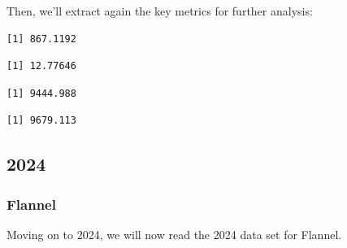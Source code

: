 Then, we'll extract again the key metrics for further analysis:

\begin{Shaded}
\begin{Highlighting}[]
\SpecialCharTok{\$}
\end{Highlighting}
\end{Shaded}

\begin{verbatim}
[1] 867.1192
\end{verbatim}

\begin{Shaded}
\begin{Highlighting}[]
\SpecialCharTok{\$}
\end{Highlighting}
\end{Shaded}

\begin{verbatim}
[1] 12.77646
\end{verbatim}

\begin{Shaded}
\begin{Highlighting}[]
\SpecialCharTok{\$}
\end{Highlighting}
\end{Shaded}

\begin{verbatim}
[1] 9444.988
\end{verbatim}

\begin{Shaded}
\begin{Highlighting}[]
\SpecialCharTok{\$}
\end{Highlighting}
\end{Shaded}

\begin{verbatim}
[1] 9679.113
\end{verbatim}

\subsection{2024}

\subsubsection{Flannel}

Moving on to 2024, we will now read the 2024 data set for Flannel.

